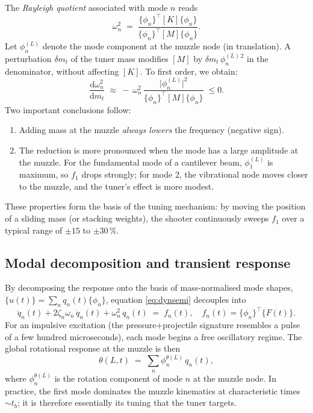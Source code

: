 \documentclass[12pt,a4paper]{article}
\begin{document}
	The \emph{Rayleigh quotient} associated with mode $n$ reads
	\begin{equation}
		\omega_n^2 \;=\; \frac{\{\phi_n\}^{\!\top}[K]\{\phi_n\}}{\{\phi_n\}^{\!\top}[M]\{\phi_n\}}.
	\end{equation}
	Let $\phi_n^{(L)}$ denote the mode component at the muzzle node (in translation). A perturbation $\delta m_t$ of the tuner mass modifies $[M]$ by $\delta m_t\,\phi_n^{(L)\,2}$ in the denominator, without affecting $[K]$. To first order, we obtain:
	\begin{equation}
		\label{eq:dwdmt}
		\boxed{\;\frac{\mathrm{d}\omega_n^2}{\mathrm{d}m_t} \;\approx\; -\,\omega_n^2\,\frac{\big|\phi_n^{(L)}\big|^2}{\{\phi_n\}^{\!\top}[M]\{\phi_n\}}\;\le 0.\;}
	\end{equation}
	Two important conclusions follow:
	\begin{enumerate}
		\item Adding mass at the muzzle \emph{always lowers} the frequency (negative sign).
		\item The reduction is more pronounced when the mode has a large amplitude at the muzzle. For the fundamental mode of a cantilever beam, $\phi_1^{(L)}$ is maximum, so $f_1$ drops strongly; for mode 2, the vibrational node moves closer to the muzzle, and the tuner's effect is more modest.
	\end{enumerate}
	These properties form the basis of the tuning mechanism: by moving the position of a sliding mass (or stacking weights), the shooter continuously sweeps $f_1$ over a typical range of $\pm 15$ to $\pm 30\,\%$.

	\subsection{Modal decomposition and transient response}

	By decomposing the response onto the basis of mass-normalised mode shapes, $\{u(t)\} = \sum_n q_n(t)\{\phi_n\}$, equation \eqref{eq:dynsemi} decouples into
	\begin{equation}
		\ddot q_n(t) + 2\zeta_n \omega_n\, \dot q_n(t) + \omega_n^2\, q_n(t) \;=\; f_n(t),\quad f_n(t) = \{\phi_n\}^{\!\top}\{F(t)\}.
	\end{equation}
	For an impulsive excitation (the pressure+projectile signature resembles a pulse of a few hundred microseconds), each mode begins a free oscillatory regime. The global rotational response at the muzzle is then
	\begin{equation}
		\theta(L,t) \;=\; \sum_n \phi_n^{\theta(L)}\, q_n(t),
	\end{equation}
	where $\phi_n^{\theta(L)}$ is the rotation component of mode $n$ at the muzzle node. In practice, the first mode dominates the muzzle kinematics at characteristic times $\sim t_b$; it is therefore essentially its tuning that the tuner targets.
\end{document}
